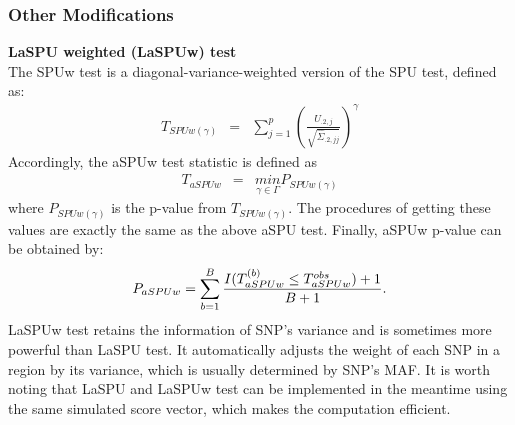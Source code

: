 \documentclass[12pt]{article}
\begin{document}
\subsubsection{Other Modifications}
\textbf{LaSPU weighted (LaSPUw) test}\\
The SPUw test is a {diagonal-variance-weighted} version of the SPU test, defined as:
\begin{eqnarray*}
T_{SPUw(\gamma)} & = & \sum_{j=1}^{p}\left(\frac{U_{.2,j}}{\sqrt{\hat{\Sigma}_{.2,jj}}}\right)^{\gamma}
\end{eqnarray*}
Accordingly, {the aSPUw test} statistic is defined as
\begin{eqnarray*}
T_{aSPUw} & = & \underset{\gamma\in\Gamma}{min}P_{SPUw(\gamma)}
\end{eqnarray*}
where $P_{SPUw(\gamma)}$ is the p-value from $T_{SPUw(\gamma)}$. The procedures of getting these values are exactly the same as the above {aSPU} test. Finally, aSPUw p-value can be obtained by:
$$
P_{aSPUw} = \sum_{b=1}^B { I(T ^ {(b)} _{aSPUw} \leq T ^ {obs} _{aSPUw} ) + 1  \over B + 1 }.
$$
LaSPUw test retains the information of SNP's variance and is sometimes more powerful than LaSPU test. It automatically adjusts the weight of each SNP in a region by its variance, which is usually determined by SNP's MAF. It is worth noting that {LaSPU} and {LaSPUw} test can be implemented in the meantime using the same simulated score vector, which makes the computation efficient.

%
\end{document}
